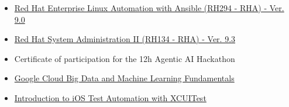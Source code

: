 \documentclass[10pt,a4paper,withhyper]{altacv}
\begin{document}
\begin{paracol}{2}
\vspace{1em} %

\vspace{0.3em} 
\vspace{0.3em} 
\vspace{0.3em} 
\vspace{0.3em} 
\vspace{0.3em} 
\vspace{0.3em} 

\newpage

\begin{itemize}
\item \href{https://www.credly.com/badges/4f5f6b86-c9ec-45d9-86ae-5cbb1d991d3e/linked_in_profile}{Red Hat Enterprise Linux Automation with Ansible (RH294 - RHA) - Ver. 9.0}
\end{itemize}
\divider

\begin{itemize}
\item \href{https://www.credly.com/badges/28664aa9-2d8e-4b69-94be-2357f34806e5/linked_in_profile}{Red Hat System Administration II (RH134 - RHA) - Ver. 9.3}
\end{itemize}
\divider

\begin{itemize}
\item Certificate of participation for the 12h Agentic AI Hackathon
\end{itemize}

\divider

\begin{itemize}
  \item \href{https://www.coursera.org/account/accomplishments/certificate/4EHEGSJ3746D}{Google Cloud Big Data and Machine Learning
Fundamentals}
\end{itemize}

\divider

\begin{itemize}
\item \href{https://testautomationu.applitools.com/certificate/?id=b5472478}{Introduction to iOS Test Automation with XCUITest}
\end{itemize}


\end{paracol}
\end{document}
